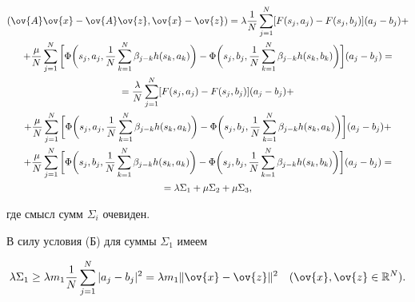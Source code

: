 \begin{multline}


(\ov{A}\ov{x}-\ov{A}\ov{z},\ov{x}-\ov{z})=\lambda\frac{1}{N}


\sum_{j=1}^N[F(s_j,a_j)-F(s_j,b_j)] (a_j-b_j)+ \\


%


+\frac{\mu}{N}\sum_{j=1}^N\bigg[\Phi\bigg(s_j,a_j,\frac{1}{N}\sum_{k=1}^N


\beta_{j-k}h(s_k,a_k)\bigg)-\Phi\bigg(s_j,b_j,\frac{1}{N}\sum_{k=1}^N


\beta_{j-k}h(s_k,b_k)\bigg)\bigg] (a_j-b_j)= \\


%


=\frac{\lambda}{N}\sum_{j=1}^N[F(s_j,a_j)-F(s_j,b_j)] (a_j-b_j)+ \\


%


+\frac{\mu}{N}\sum_{j=1}^N\bigg[\Phi\bigg(s_j,a_j,\frac{1}{N}\sum_{k=1}^N


\beta_{j-k}h(s_k,a_k)\bigg)-\Phi\bigg(s_j,b_j,\frac{1}{N}\sum_{k=1}^N


\beta_{j-k}h(s_k,a_k)\bigg)\bigg] (a_j-b_j)+ \\


%


+\frac{\mu}{N}\sum_{j=1}^N\bigg[\Phi\bigg(s_j,b_j,\frac{1}{N}\sum_{k=1}^N


\beta_{j-k}h(s_k,a_k)\bigg)-\Phi\bigg(s_j,b_j,\frac{1}{N}\sum_{k=1}^N


\beta_{j-k}h(s_k,b_k)\bigg)\bigg] (a_j-b_j)= \\


%


=\lambda \Sigma_1+\mu \Sigma_2+\mu \Sigma_3,


\end{multline}


где смысл сумм $\Sigma_i$ очевиден.





В силу условия (Б) для суммы $\Sigma_1$ имеем


\begin{equation}


\lambda \Sigma_1\geq \lambda m_1\frac{1}{N}\sum_{j=1}^N|a_j-


b_j|^2=\lambda m_1\|\ov{x}-\ov{z}\|^2\quad


(\ov{x},\ov{z}\in \Bbb R^N).


\end{equation}


